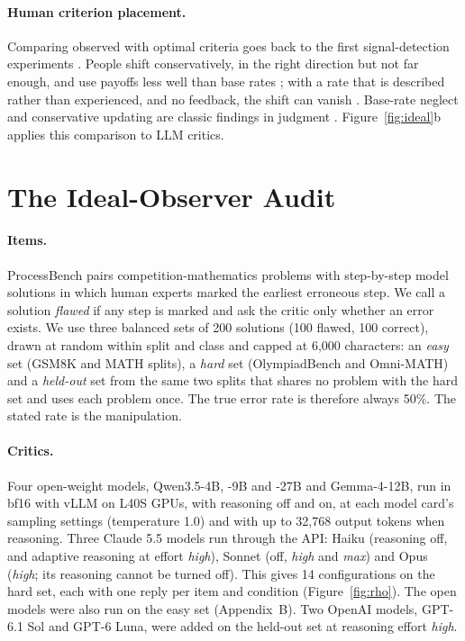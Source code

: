 \documentclass[letterpaper]{article} %
\begin{document}
\paragraph{Human criterion placement.} Comparing observed with optimal criteria goes back to the first signal-detection experiments \citep{green1966signal}. People shift conservatively, in the right direction but not far enough, and use payoffs less well than base rates \citep{ulehla1966optimality,healy1981probability,bohil2001category,maddox2002toward,rahnev2018suboptimality}; with a rate that is described rather than experienced, and no feedback, the shift can vanish \citep{estes1995interactions}. Base-rate neglect and conservative updating are classic findings in judgment \citep{kahneman1973psychology,edwards1982conservatism}. Figure~\ref{fig:ideal}b applies this comparison to LLM critics.

\section{The Ideal-Observer Audit}
\label{sec:method}

\paragraph{Items.} ProcessBench \citep{zheng2025processbench} pairs competition-mathematics problems with step-by-step model solutions in which human experts marked the earliest erroneous step. We call a solution \emph{flawed} if any step is marked and ask the critic only whether an error exists. We use three balanced sets of 200 solutions (100 flawed, 100 correct), drawn at random within split and class and capped at 6,000 characters: an \emph{easy} set (GSM8K and MATH splits), a \emph{hard} set (OlympiadBench and Omni-MATH) and a \emph{held-out} set from the same two splits that shares no problem with the hard set and uses each problem once. The true error rate is therefore always 50\%. The stated rate is the manipulation.

\paragraph{Critics.} Four open-weight models, Qwen3.5-4B, -9B and -27B and Gemma-4-12B, run in bf16 with vLLM on L40S GPUs, with reasoning off and on, at each model card's sampling settings (temperature 1.0) and with up to 32,768 output tokens when reasoning. Three Claude 5.5 models run through the API: Haiku (reasoning off, and adaptive reasoning at effort \emph{high}), Sonnet (off, \emph{high} and \emph{max}) and Opus (\emph{high}; its reasoning cannot be turned off). This gives 14 configurations on the hard set, each with one reply per item and condition (Figure~\ref{fig:rho}). The open models were also run on the easy set (Appendix~B). Two OpenAI models, GPT-6.1 Sol and GPT-6 Luna, were added on the held-out set at reasoning effort \emph{high}.
\end{document}

